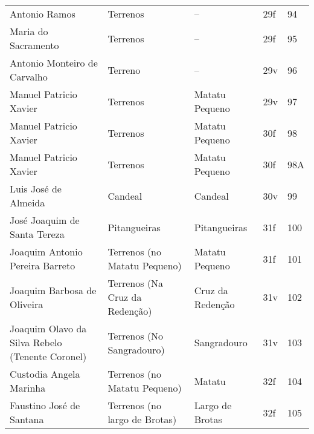 \begin{table}
{\begin{minipage}{\textwidth}
\begin{tiny}
\begin{tabular}{p{4cm}p{4cm}p{4cm}ll}
Antonio Ramos									&Terrenos				&--					&29f			&94			\\
Maria do Sacramento								&Terrenos				&--					&29f			&95			\\
Antonio Monteiro de Carvalho							&Terreno				&--					&29v			&96			\\
Manuel Patricio Xavier								&Terrenos				&Matatu Pequeno				&29v			&97			\\
Manuel Patricio Xavier								&Terrenos				&Matatu Pequeno				&30f			&98			\\
Manuel Patricio Xavier								&Terrenos				&Matatu Pequeno				&30f			&98A			\\
Luis José de Almeida								&Candeal				&Candeal				&30v			&99			\\
José Joaquim de Santa Tereza							&Pitangueiras				&Pitangueiras				&31f			&100			\\
Joaquim Antonio Pereira Barreto							&Terrenos (no Matatu Pequeno)		&Matatu Pequeno				&31f			&101			\\
Joaquim Barbosa de Oliveira							&Terrenos (Na Cruz da Redenção)		&Cruz da Redenção			&31v			&102			\\
Joaquim Olavo da Silva Rebelo (Tenente Coronel)					&Terrenos (No Sangradouro)		&Sangradouro				&31v			&103			\\
Custodia Angela Marinha								&Terrenos (no Matatu Pequeno)		&Matatu					&32f			&104			\\
Faustino José de Santana							&Terrenos (no largo de Brotas)		&Largo de Brotas			&32f			&105			\\
\bottomrule
\end{tabular} 
\end{tiny}
\end{minipage}
}
{}
\end{table}

